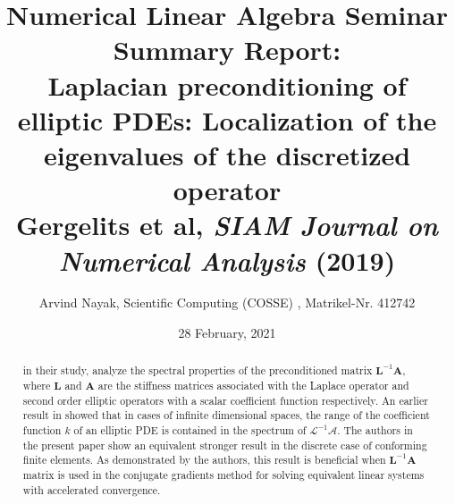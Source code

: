\titlehead{\centering Technische Universität Berlin | Fakultät II | Mathematik und Naturwissenschaften}
\title{\Large Numerical Linear Algebra Seminar \\ \vspace{0.5cm} \large Summary Report: \\ Laplacian preconditioning of elliptic PDEs: Localization of the eigenvalues of the discretized operator \\ \normalsize Gergelits et al, \emph{SIAM Journal on Numerical Analysis} (2019)}
\author{Arvind Nayak, Scientific Computing (COSSE) , Matrikel-Nr. 412742}
\date{28 February, 2021}
\publishers{}

\maketitle

\begin{abstract}
	\noindent
        \textcite*{gergelits2019laplacian} in their study, analyze the spectral properties of the preconditioned matrix $\mathbf{L}^{-1}\mathbf{A}$, where $\mathbf{L}$ and $\mathbf{A}$ are the stiffness matrices associated with the Laplace operator and second order elliptic operators with a scalar coefficient function respectively. An earlier result in \cite{nielsen2009preconditioning} showed that in cases of infinite dimensional spaces, the range of the coefficient function $k$ of an elliptic PDE is contained in the spectrum of $\mathcal{L}^{-1}\mathcal{A}$. The authors in the present paper show an equivalent stronger result in the discrete case of conforming finite elements. As demonstrated by the authors, this result is beneficial when  $\mathbf{L}^{-1}\mathbf{A}$ matrix is used in the conjugate gradients method for solving equivalent linear systems with accelerated convergence.  
\end{abstract}

\setcounter{tocdepth}{2}
